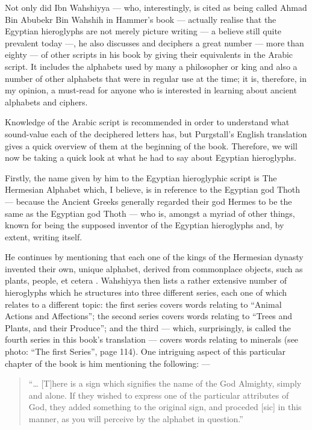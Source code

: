 \documentclass[a5paper,twoside,11pt]{report}
\begin{document}
	Not only did Ibn Wahshiyya — who, interestingly, is cited as being called Ahmad Bin Abubekr Bin Wahshih in Hammer’s book — actually realise that the Egyptian hieroglyphs are not merely picture writing — a believe still quite prevalent today —, he also discusses and deciphers a great number — more than eighty — of other scripts in his book by giving their equivalents in the Arabic script. It includes the alphabets used by many a philosopher or king and also a number of other alphabets that were in regular use at the time; it is, therefore, in my opinion, a must-read for anyone who is interested in learning about ancient alphabets and ciphers. 

	Knowledge of the Arabic script is recommended in order to understand what sound-value each of the deciphered letters has, but Purgstall's English translation gives a quick overview of them at the beginning of the book. Therefore, we will now be taking a quick look at what he had to say about Egyptian hieroglyphs.

	Firstly, the name given by him to the Egyptian hieroglyphic script is The Hermesian Alphabet \parencite[p. 14]{wahshiyya} which, I believe, is in reference to the Egyptian god Thoth — because the Ancient Greeks generally regarded their god Hermes to be the same as the Egyptian god Thoth — who is, amongst a myriad of other things, known for being the supposed inventor of the Egyptian hieroglyphs and, by extent, writing itself.

	He continues by mentioning that each one of the kings of the Hermesian dynasty invented their own, unique alphabet, derived from commonplace objects, such as plants, people, et cetera \parencite[pp. 14-15]{wahshiyya}. Wahshiyya then lists a rather extensive number of hieroglyphs which he structures into three different series, each one of which relates to a different topic: the first series covers words relating to “Animal Actions and Affections”; the second series covers words relating to “Trees and Plants, and their Produce”; and the third — which, surprisingly, is called the fourth series in this book’s translation — covers words relating to minerals (see photo: “The first Series”, page 114). \parencite[pp. 19-40]{wahshiyya}
	One intriguing aspect of this particular chapter of the book is him mentioning the following: —

	\begin{quote}“… [T]here is a sign which signifies the name of the God Almighty, simply and alone. If they wished to express one of the particular attributes of God, they added something to the original sign, and proceded [sic] in this manner, as you will perceive by the alphabet in question.” \parencite[p. 16]{wahshiyya}\end{quote}
\end{document}

